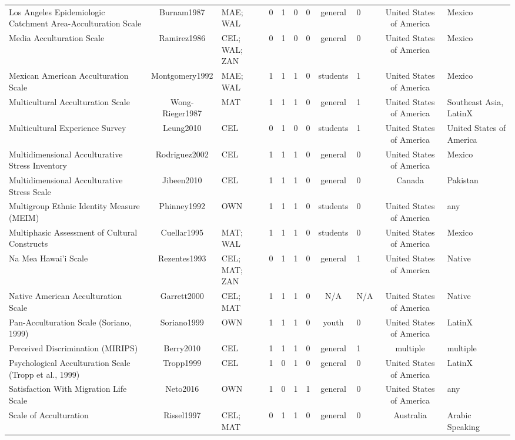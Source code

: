 \begin{longtable}[l]{lclclclclcl}
Los Angeles Epidemiologic Catchment Area-Acculturation Scale & Burnam1987 & MAE; WAL & 0 & 1 & 0 & 0 & general & 0 & United States of America & Mexico\\
Media Acculturation Scale & Ramirez1986 & CEL; WAL; ZAN & 0 & 1 & 0 & 0 & general & 0 & United States of America & Mexico\\
Mexican American Acculturation Scale & Montgomery1992 & MAE; WAL & 1 & 1 & 1 & 0 & students & 1 & United States of America & Mexico\\
Multicultural Acculturation Scale & Wong-Rieger1987 & MAT & 1 & 1 & 1 & 0 & general & 1 & United States of America & Southeast Asia, LatinX\\
Multicultural Experience Survey & Leung2010 & CEL & 0 & 1 & 0 & 0 & students & 1 & United States of America & United States of America\\
Multidimensional Acculturative Stress Inventory & Rodriguez2002 & CEL & 1 & 1 & 1 & 0 & general & 0 & United States of America & Mexico\\
Multidimensional Acculturative Stress Scale & Jibeen2010 & CEL & 1 & 1 & 1 & 0 & general & 0 & Canada & Pakistan\\
Multigroup Ethnic Identity Measure (MEIM) & Phinney1992 & OWN & 1 & 1 & 1 & 0 & students & 0 & United States of America & any\\
Multiphasic Assessment of Cultural Constructs & Cuellar1995 & MAT; WAL & 1 & 1 & 1 & 0 & students & 0 & United States of America & Mexico\\
Na Mea Hawai’i Scale & Rezentes1993 & CEL; MAT; ZAN & 0 & 1 & 1 & 0 & general & 1 & United States of America & Native\\
Native American Acculturation Scale & Garrett2000 & CEL; MAT & 1 & 1 & 1 & 0 & N/A & N/A & United States of America & Native\\
Pan-Acculturation Scale (Soriano, 1999) & Soriano1999 & OWN & 1 & 1 & 1 & 0 & youth & 0 & United States of America & LatinX\\
Perceived Discrimination (MIRIPS) & Berry2010 & CEL & 1 & 1 & 1 & 0 & general & 1 & multiple & multiple\\
Psychological Acculturation Scale (Tropp et al., 1999) & Tropp1999 & CEL & 1 & 0 & 1 & 0 & general & 0 & United States of America & LatinX\\
Satisfaction With Migration Life Scale & Neto2016 & OWN & 1 & 0 & 1 & 1 & general & 0 & United States of America & any\\
Scale of Acculturation & Rissel1997 & CEL; MAT & 0 & 1 & 1 & 0 & general & 0 & Australia & Arabic Speaking\\

\end{longtable}
